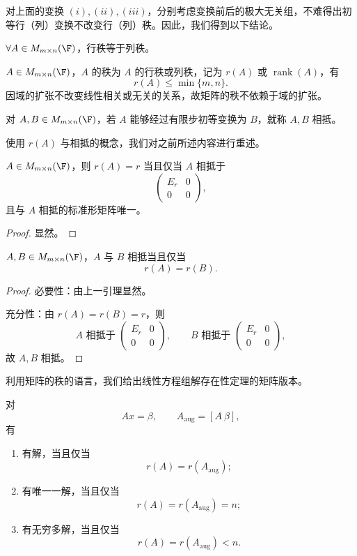 对上面的变换 $(i),(ii),(iii)$，分别考虑变换前后的极大无关组，不难得出初等行（列）变换不改变行（列）秩。因此，我们得到以下结论。

\begin{theorem}
	$\forall A\in M_{m\times n}(\F)$，行秩等于列秩。
\end{theorem}

\begin{definition}\label{p1:concept:c2-l904}
	$A\in M_{m\times n}(\F)$，$A$ 的秩为 $A$ 的行秩或列秩，记为 $r(A)$ 或 $\operatorname{rank}(A)$，有
	\[
	r(A)\leq\min\{m,n\}.
	\]
	因域的扩张不改变线性相关或无关的关系，故矩阵的秩不依赖于域的扩张。
	
	
\end{definition}
对 $A,B\in M_{m\times n}(\F)$，若 $A$ 能够经过有限步初等变换为 $B$，就称 $A,B$ 相抵。

使用 $r(A)$ 与相抵的概念，我们对之前所述内容进行重述。

\begin{lemma}
	$A\in M_{m\times n}(\F)$，则 $r(A)=r$ 当且仅当 $A$ 相抵于
	\[
	\begin{pmatrix}
		E_r&0\\
		0&0
	\end{pmatrix},
	\]
	且与 $A$ 相抵的标准形矩阵唯一。
\end{lemma}
\begin{proof}
	显然。
\end{proof}

\begin{proposition}
	$A,B\in M_{m\times n}(\F)$，$A$ 与 $B$ 相抵当且仅当
	\[
	r(A)=r(B).
	\]
\end{proposition}
\begin{proof}
	必要性：由上一引理显然。
	
	充分性：由 $r(A)=r(B)=r$，则
	\[
	A\text{ 相抵于 }
	\begin{pmatrix}
		E_r&0\\
		0&0
	\end{pmatrix},
	\qquad
	B\text{ 相抵于 }
	\begin{pmatrix}
		E_r&0\\
		0&0
	\end{pmatrix},
	\]
	故 $A,B$ 相抵。
\end{proof}

利用矩阵的秩的语言，我们给出线性方程组解存在性定理的矩阵版本。

\begin{proposition}\label{2.4.12}
	对
	\[
	Ax=\beta,
	\qquad
	A_{\mathrm{aug}}=[A\ \beta],
	\]
	有
	\begin{enumerate}
		\item 有解，当且仅当
		\[
		r(A)=r(A_{\mathrm{aug}});
		\]
		\item 有唯一一解，当且仅当
		\[
		r(A)=r(A_{\mathrm{aug}})=n;
		\]
		\item 有无穷多解，当且仅当
		\[
		r(A)=r(A_{\mathrm{aug}})<n.
		\]
	\end{enumerate}
\end{proposition}

